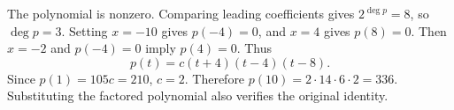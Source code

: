 The polynomial is nonzero. Comparing leading coefficients gives $2^{\deg p}=8$, so $\deg p=3$. Setting $x=-10$ gives $p(-4)=0$, and $x=4$ gives $p(8)=0$. Then $x=-2$ and $p(-4)=0$ imply $p(4)=0$. Thus
\[
p(t)=c(t+4)(t-4)(t-8).
\]
Since $p(1)=105c=210$, $c=2$. Therefore $\boxed{p(10)=2\cdot14\cdot6\cdot2=336}$. Substituting the factored polynomial also verifies the original identity.
